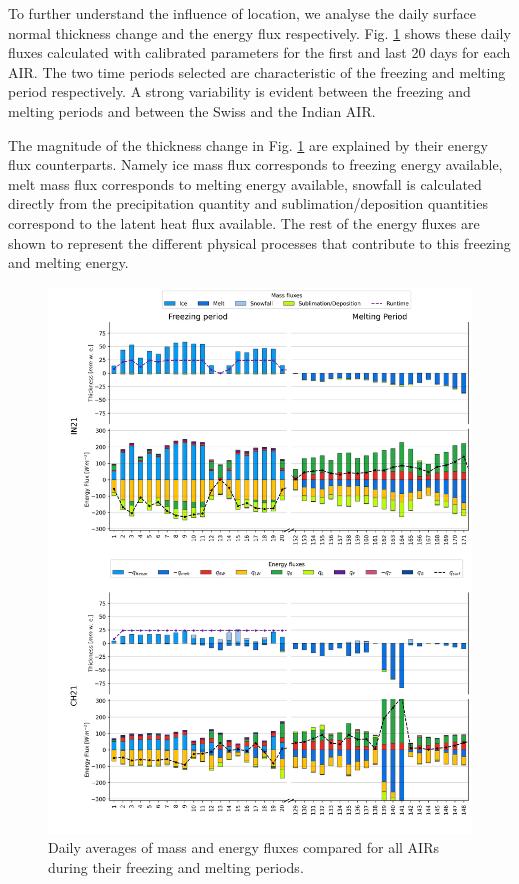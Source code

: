\documentclass[utf8]{frontiersSCNS} %
\begin{document}
To further understand the influence of location, we analyse the daily surface normal thickness change and the
energy flux respectively. Fig.  \ref{fig:MEB} shows these daily fluxes calculated with calibrated parameters for
the first and last 20 days for each AIR. The two time periods selected are characteristic of the freezing and
melting period respectively. A strong variability is evident between the freezing and melting periods and between
the Swiss and the Indian AIR.

The magnitude of the thickness change in Fig. \ref{fig:MEB} are explained by their energy flux counterparts. Namely
ice mass flux corresponds to freezing energy available, melt mass flux corresponds to melting energy available,
snowfall is calculated directly from the precipitation quantity and sublimation/deposition quantities correspond to
the latent heat flux available. The rest of the energy fluxes are shown to represent the different physical
processes that contribute to this freezing and melting energy.

\begin{figure}
	\begin{center}
		\includegraphics[width=\linewidth]{Figures/mass_energy_bal.jpg} \end{center}
	\caption{Daily averages of mass and energy fluxes compared for all AIRs during their freezing and melting periods.
	} \label{fig:MEB}
\end{figure}
\end{document}

